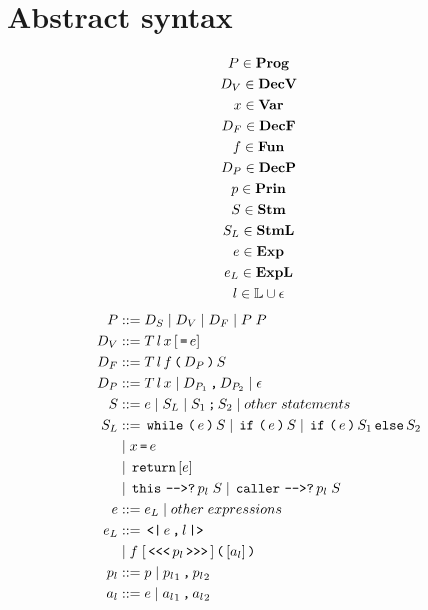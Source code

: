 \section{Abstract syntax}

\begin{gather*}
  P   \in \mathbf{Prog}\\
  D_V \in \mathbf{DecV}\\
  x   \in \mathbf{Var}\\
  D_F \in \mathbf{DecF} \\
  f   \in \mathbf{Fun}\\
  D_P \in \mathbf{DecP}\\
  p   \in \mathbf{Prin}\\
  S   \in \mathbf{Stm}\\
  S_L \in \mathbf{StmL}\\
  e   \in \mathbf{Exp}\\
  e_L \in \mathbf{ExpL}\\
  l   \in \mathbb{L} \cup \epsilon\\
\end{gather*}
\begin{align*}
  P       & ::= D_S \gp D_V \gp D_F \gp P \; P \\
  D_V     & ::= T \, l \, x \, [\tk = e] \\
  D_F     & ::= T \, l \, f \tk ( D_P \tk ) S \\
  D_P     & ::= T \, l \, x \gp D_{P_1} \tk , D_{P_2} \gp \epsilon \\
  S       & ::= e \gp S_L \gp S_1 \tk ; S_2 \gp other \; statements \\
  S_L     & ::= \tk{while} \tk ( e \tk ) S \gp \tk{if} \tk ( e \tk ) S \gp \tk{if} \tk ( e \tk ) S_1 \tk{else} S_2 \\
          & \gp x \tk = e \\
          & \gp \tk{return} [e] \\
          & \gp \tk{this} \tk{-{}->?} p_l \; S \gp \tk{caller} \tk{-{}->?} p_l \; S \\
  e       & ::= e_L \gp other \; expressions \\
  e_L     & ::= \tk{<|} e \tk , l \tk{|>} \\
          & \gp f \; [\tk{<{}<{}<} p_l \tk{>{}>{}>}] \tk ( [a_l] \tk ) \\
  p_l     & ::= p \gp {p_l}_1 \tk , {p_l}_2 \\
  a_l     & ::= e \gp {a_l}_1 \tk , {a_l}_2
\end{align*}

